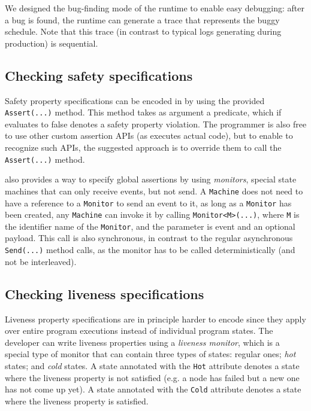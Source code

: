 We designed the bug-finding mode of the \psharp runtime to enable easy debugging: after a bug is found, the runtime can generate a trace that represents the buggy schedule. Note that this trace (in contrast to typical logs generating during production) is sequential.

\subsection{Checking safety specifications}
\label{sec:psharp:safety}

Safety property specifications can be encoded in \psharp by using the provided \texttt{Assert(...)} method. This method takes as argument a predicate, which if evaluates to false denotes a safety property violation. The programmer is also free to use other custom assertion APIs (as \psharp executes actual code), but to enable \psharp to recognize such APIs, the suggested approach is to override them to call the \psharp \texttt{Assert(...)} method.

\psharp also provides a way to specify global assertions by using \emph{monitors}, special state machines that
can only receive events, but not send. A \texttt{Machine} does not need to have a reference to a \texttt{Monitor} to send an event to it, as long as a \texttt{Monitor} has been created, any \texttt{Machine} can invoke it by calling \texttt{Monitor<M>(...)}, where \texttt{M} is the identifier name of the \texttt{Monitor}, and the parameter is event and an optional payload. This call is also synchronous, in contrast to the regular asynchronous \texttt{Send(...)} method calls, as the monitor has to be called deterministically (and not be interleaved).

\subsection{Checking liveness specifications}
\label{sec:psharp:liveness}

Liveness property specifications are in principle harder to encode since they apply over entire program executions instead of individual program states. The \psharp developer can write liveness properties using a \emph{liveness monitor}, which is a special type of monitor that can contain three types of states: regular ones; \emph{hot} states; and \emph{cold} states. A state annotated with the \texttt{Hot} attribute denotes a state where the liveness property is not satisfied (e.g. a node has failed but a new one has not come up yet). A state annotated with the \texttt{Cold} attribute denotes a state where the liveness property is satisfied.


